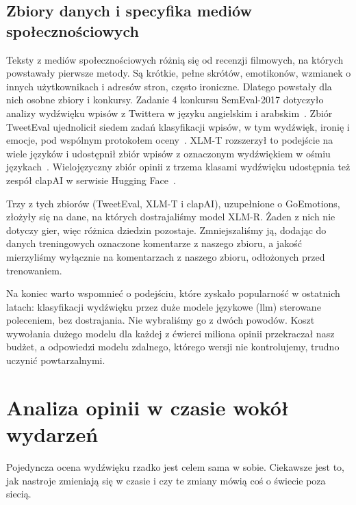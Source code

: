 \subsection{Zbiory danych i specyfika mediów społecznościowych}
\label{sec:sentiment-social-media}

Teksty z mediów społecznościowych różnią się od recenzji filmowych, na których powstawały pierwsze metody.
Są krótkie, pełne skrótów, emotikonów, wzmianek o innych użytkownikach i adresów stron, często ironiczne.
Dlatego powstały dla nich osobne zbiory i konkursy.
Zadanie 4 konkursu SemEval-2017 dotyczyło analizy wydźwięku wpisów z Twittera w języku angielskim i arabskim~\cite{rosenthal2017semeval2017}.
Zbiór TweetEval ujednolicił siedem zadań klasyfikacji wpisów, w tym wydźwięk, ironię i emocje, pod wspólnym protokołem oceny~\cite{barbieri2020tweeteval}.
XLM-T rozszerzył to podejście na wiele języków i udostępnił zbiór wpisów z oznaczonym wydźwiękiem w ośmiu językach~\cite{barbieri2022xlmt}.
Wielojęzyczny zbiór opinii z trzema klasami wydźwięku udostępnia też zespół clapAI w serwisie Hugging Face~\cite{clapaimultilingualsentiment}.

Trzy z tych zbiorów (TweetEval, XLM-T i clapAI), uzupełnione o GoEmotions, złożyły się na dane, na których dostrajaliśmy model XLM-R.
Żaden z nich nie dotyczy gier, więc różnica dziedzin pozostaje.
Zmniejszaliśmy ją, dodając do danych treningowych oznaczone komentarze z naszego zbioru, a jakość mierzyliśmy wyłącznie na komentarzach z naszego zbioru, odłożonych przed trenowaniem.

Na koniec warto wspomnieć o podejściu, które zyskało popularność w ostatnich latach: klasyfikacji wydźwięku przez duże modele językowe (\ac{llm}) sterowane poleceniem, bez dostrajania.
Nie wybraliśmy go z dwóch powodów.
Koszt wywołania dużego modelu dla każdej z ćwierci miliona opinii przekraczał nasz budżet, a odpowiedzi modelu zdalnego, którego wersji nie kontrolujemy, trudno uczynić powtarzalnymi.

\section{Analiza opinii w czasie wokół wydarzeń}
\label{sec:sentiment-time}

Pojedyncza ocena wydźwięku rzadko jest celem sama w sobie.
Ciekawsze jest to, jak nastroje zmieniają się w czasie i czy te zmiany mówią coś o świecie poza siecią.

